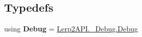 \subsection*{Typedefs}
\begin{DoxyCompactItemize}
\item 
\mbox{\label{namespace_serialization_a00932223072ac80e7b3bb0007c0be9c1}} 
using {\bfseries Debug} = \hyperlink{class_lerp2_a_p_i_1_1___debug_1_1_debug}{Lerp2\+A\+P\+I.\+\_\+\+Debug.\+Debug}
\end{DoxyCompactItemize}
